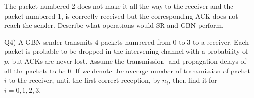 \documentclass[10pt,letterpaper]{article}
\begin{document}
The packet numbered 2 does not make it all the way to the receiver and the packet numbered 1, is correctly received but the corresponding ACK does not reach the sender. Describe what operations would SR and GBN perform.

Q4) A GBN sender transmits 4 packets numbered from 0 to 3 to a receiver. Each packet is probable to be dropped in the intervening channel with a probability of $p$, but ACKs are never lost. Assume the transmission- and propagation delays of all the packets to be 0. If we denote the average number of transmission of packet $i$ to the receiver, until the first correct reception, by $n_i$, then find it for $i=0,1,2,3$.
%
\end{document}
